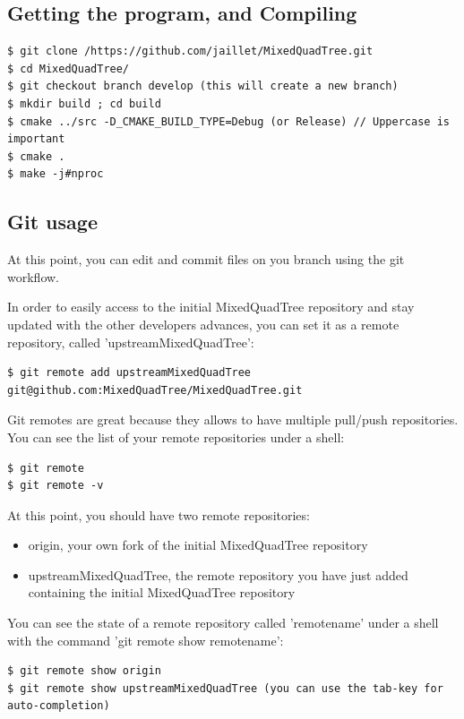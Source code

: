 \documentclass[10pt]{article}
\begin{document}
\subsection{Getting the program, and Compiling}

{\small
\begin{verbatim}
$ git clone /https://github.com/jaillet/MixedQuadTree.git
$ cd MixedQuadTree/
$ git checkout branch develop (this will create a new branch)
$ mkdir build ; cd build
$ cmake ../src -D_CMAKE_BUILD_TYPE=Debug (or Release) // Uppercase is important
$ cmake .
$ make -j#nproc
\end{verbatim}
}

\subsection{Git usage}
At this point, you can edit and commit files on you branch using  the git workflow.

In order to easily access to the initial MixedQuadTree repository and stay updated with the other developers advances, you can set it as a remote repository, called 'upstreamMixedQuadTree':

\begin{verbatim}
$ git remote add upstreamMixedQuadTree git@github.com:MixedQuadTree/MixedQuadTree.git
\end{verbatim}

Git remotes are great because they allows to have multiple pull/push repositories. You can see the list of your remote repositories under a shell:

\begin{verbatim}
$ git remote
$ git remote -v
\end{verbatim}

At this point, you should have two remote repositories:
%
\begin{itemize}
\item origin, your own fork of the initial MixedQuadTree repository
\item upstreamMixedQuadTree, the remote repository you have just added containing the initial MixedQuadTree repository
\end{itemize}

You can see the state of a remote repository called 'remotename' under a shell with the command 'git remote show remotename':
%
\begin{verbatim}
$ git remote show origin
$ git remote show upstreamMixedQuadTree (you can use the tab-key for auto-completion)
\end{verbatim}
\end{document}
